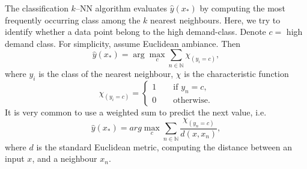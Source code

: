         The classification  $k$--NN algorithm evaluates $\hat{y}(x_{*})$ by computing the most frequently occurring class among the $k$ nearest neighbours. Here, we try to identify whether a data point belong to the high demand-class. Denote $c=$ high demand class. For simplicity, assume Euclidean ambiance. Then
            \begin{equation*}
                \hat{y}(x_*) = \arg \max_{c}  \sum_{n \in \mathbb{N}} \chi_{(y_i = c)} ,
            \end{equation*}
        where $y_i$ is the class of the nearest neighbour,  $\chi$ is the characteristic function 
            \begin{equation*}
                \chi_{(y_i = c)} = 
                \begin{cases}
                    1 \qquad \text{if } y_n = c, \\
                    0 \qquad \text{otherwise}.
                    
                \end{cases}
            \end{equation*}
        It is very common to use a weighted sum to predict the next value, i.e.
            \begin{equation*}
                \hat{y}(x_*) =  arg \max_{c}  \sum_{n \in \mathbb{N}} \frac{\chi_{(y_n = c)}}{d(x, x_n)},
            \end{equation*}
        where $d$ is the standard Euclidean metric, computing the distance between an input $x$, and a neighbour $x_n$. 
    








